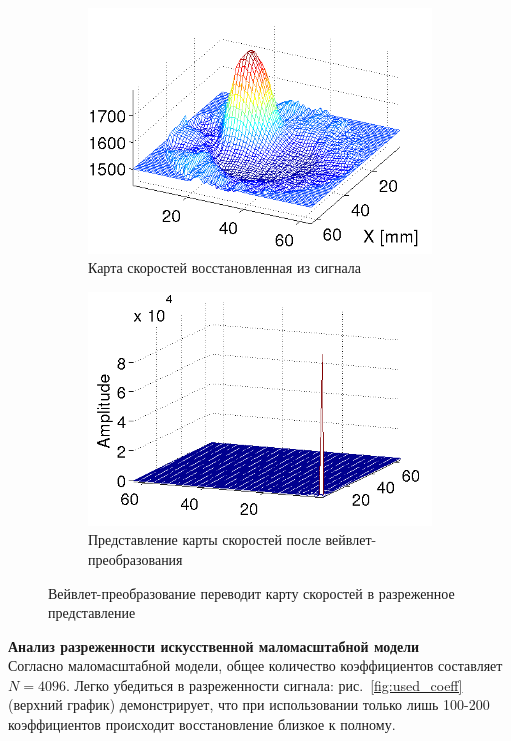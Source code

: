 \documentclass[14pt]{matmex-diploma}
\begin{document}
\begin{figure}[h]

\begin{subfigure}{.5\textwidth}
    \centering
    \includegraphics[width=0.8\linewidth]{pics/speed_map.png}
    \caption{Карта скоростей восстановленная из сигнала}
    \label{fig:speedmap}
\end{subfigure}
\begin{subfigure}{.5\textwidth}
    \centering
    \includegraphics[width=0.8\linewidth]{pics/freq_domain.png}
    \caption{Представление карты скоростей после вейвлет-преобразования}
    \label{fig:waveletted}
\end{subfigure}
    \caption{Вейвлет-преобразование переводит карту скоростей в разреженное представление}
    \label{fig:wavelet_transform}
\end{figure}

\textbf{Анализ разреженности искусственной маломасштабной модели}\\
Согласно маломасштабной модели, общее количество коэффициентов составляет $N = 4096$.  Легко убедиться в разреженности сигнала: рис.~\ref{fig:used_coeff} (верхний график) демонстрирует, что при использовании только лишь 100-200 коэффициентов происходит восстановление близкое к полному. \\
\end{document}
